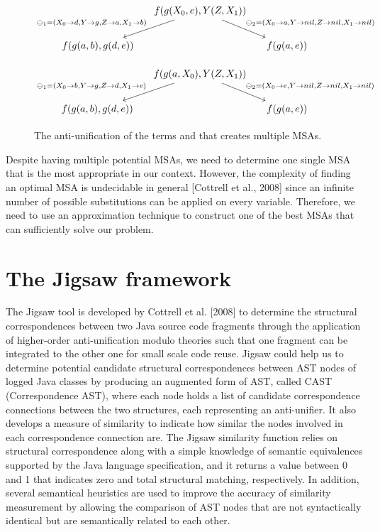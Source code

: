 \begin{figure} [H]
\[
\begin{tikzcd}[column sep=small] 
&  
  f(g(X_0,e),Y(Z,X_1))
  \arrow{dr}{\ominus_2 = ( X_0 \rightarrow a, Y \rightarrow nil, Z \rightarrow nil, X_1 \rightarrow nil) }
  \arrow[->,swap]{dl}{\ominus_1 = ( X_0 \rightarrow d, Y \rightarrow g, Z \rightarrow a, X_1 \rightarrow b)} %
\\
f(g(a,b), g(d,e))
&&
f(g(a,e)) 
\end{tikzcd}
\]	

\[
\begin{tikzcd}[column sep=small] 
&  
  f(g(a,X_0),Y(Z,X_1))
  \arrow{dr}{\ominus_2 = ( X_0 \rightarrow e, Y \rightarrow nil, Z \rightarrow nil, X_1 \rightarrow nil) }
  \arrow[->,swap]{dl}{\ominus_1 = ( X_0 \rightarrow b, Y \rightarrow g, Z \rightarrow d, X_1 \rightarrow e)} %
\\
f(g(a,b), g(d,e))
&&
f(g(a,e)) 
\end{tikzcd}
\]
  \caption{The anti-unification of the terms 
and  that creates multiple MSAs.}
  \label{fig:multipleMSA}
\end{figure}


Despite having multiple potential MSAs, we need to determine one single MSA that is the most appropriate in our context. However, the complexity of finding an optimal MSA is undecidable in general [Cottrell et al., 2008] since an infinite number of possible substitutions can be applied on every variable. Therefore, we need to use an approximation technique to construct one of the best MSAs that can sufficiently solve our problem.


\section{The Jigsaw framework}  \label{Jigsaw}
The Jigsaw tool is developed by Cottrell et al. [2008] to determine the structural correspondences between two Java source code fragments through the application of higher-order anti-unification modulo theories such that one fragment can be integrated to the other one for small scale code reuse. Jigsaw could help us to determine potential candidate structural correspondences between AST nodes of logged Java classes by producing an augmented form of AST, called CAST (Correspondence AST), where each node holds a list of candidate correspondence connections between the two structures, each representing an anti-unifier. It also develops a measure of similarity to indicate how similar the nodes involved in each correspondence connection are. The Jigsaw similarity function relies on structural correspondence along with a simple knowledge of semantic equivalences supported by the Java language specification, and it returns a value between 0 and 1 that indicates zero and total structural matching, respectively. In addition, several semantical heuristics are used to improve the accuracy of similarity measurement by allowing the comparison of AST nodes that are not syntactically identical but are semantically related to each other.

